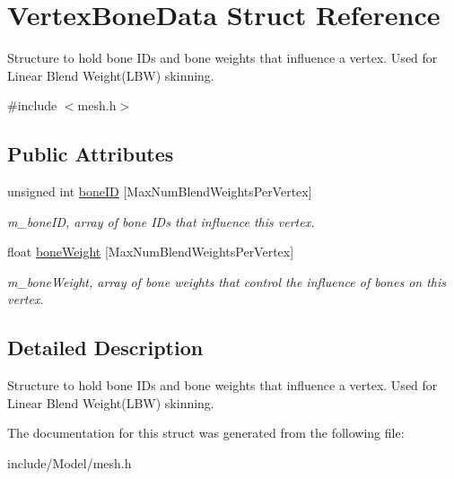 \hypertarget{structVertexBoneData}{}\section{Vertex\+Bone\+Data Struct Reference}
\label{structVertexBoneData}


Structure to hold bone I\+Ds and bone weights that influence a vertex. Used for Linear Blend Weight(\+L\+B\+W) skinning.  




{\ttfamily \#include $<$mesh.\+h$>$}

\subsection*{Public Attributes}
\begin{DoxyCompactItemize}
\item 
unsigned int \hyperlink{structVertexBoneData_a6629bd01077f6adfbd2e632d71c62acb}{bone\+ID} \mbox{[}Max\+Num\+Blend\+Weights\+Per\+Vertex\mbox{]}\hypertarget{structVertexBoneData_a6629bd01077f6adfbd2e632d71c62acb}{}\label{structVertexBoneData_a6629bd01077f6adfbd2e632d71c62acb}

\begin{DoxyCompactList}\small\item\em m\+\_\+bone\+ID, array of bone ID\textquotesingle{}s that influence this vertex. \end{DoxyCompactList}\item 
float \hyperlink{structVertexBoneData_a2c0bb02c5372c9be2fed58625375ad87}{bone\+Weight} \mbox{[}Max\+Num\+Blend\+Weights\+Per\+Vertex\mbox{]}\hypertarget{structVertexBoneData_a2c0bb02c5372c9be2fed58625375ad87}{}\label{structVertexBoneData_a2c0bb02c5372c9be2fed58625375ad87}

\begin{DoxyCompactList}\small\item\em m\+\_\+bone\+Weight, array of bone weights that control the influence of bones on this vertex. \end{DoxyCompactList}\end{DoxyCompactItemize}


\subsection{Detailed Description}
Structure to hold bone I\+Ds and bone weights that influence a vertex. Used for Linear Blend Weight(\+L\+B\+W) skinning. 

The documentation for this struct was generated from the following file\+:\begin{DoxyCompactItemize}
\item 
include/\+Model/mesh.\+h\end{DoxyCompactItemize}
